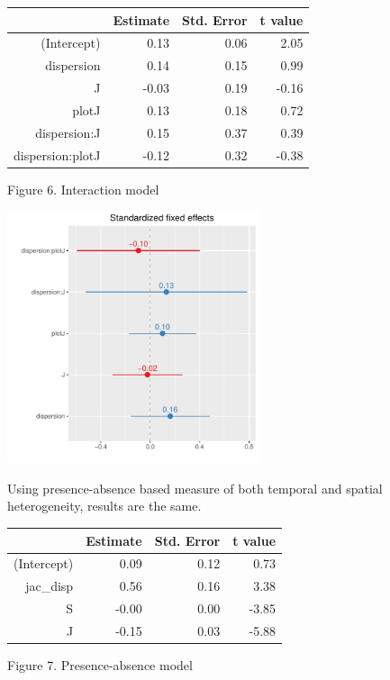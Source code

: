 \documentclass[11pt]{article}
\begin{document}
\FloatBarrier
\begin{table}[ht]
\centering
\begin{tabular}{rrrr}
  \hline
 & Estimate & Std. Error & t value \\ 
  \hline
(Intercept) & 0.13 & 0.06 & 2.05 \\ 
  dispersion & 0.14 & 0.15 & 0.99 \\ 
  J & -0.03 & 0.19 & -0.16 \\ 
  plotJ & 0.13 & 0.18 & 0.72 \\ 
  dispersion:J & 0.15 & 0.37 & 0.39 \\ 
  dispersion:plotJ & -0.12 & 0.32 & -0.38 \\ 
   \hline
\end{tabular}
\end{table}
\FloatBarrier

Figure 6. Interaction model

\includegraphics[width=280px]{interaxplot}


Using presence-absence based measure of both temporal and spatial heterogeneity, results are the same.

\FloatBarrier
\begin{table}[ht]
\centering
\begin{tabular}{rrrr}
  \hline
 & Estimate & Std. Error & t value \\ 
  \hline
(Intercept) & 0.09 & 0.12 & 0.73 \\ 
  jac\_disp & 0.56 & 0.16 & 3.38 \\ 
  S & -0.00 & 0.00 & -3.85 \\ 
  J & -0.15 & 0.03 & -5.88 \\ 
   \hline
\end{tabular}
\end{table}
\FloatBarrier

Figure 7. Presence-absence model
\end{document}
